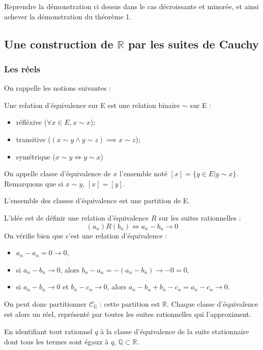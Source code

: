 \begin{exo}
    Reprendre la démonstration ci dessus dans le cas décroissante et minorée, et ainsi achever la démonstration du théorème 1.
\end{exo}

\subsection{Une construction de $\mathbb{R}$ par les suites de Cauchy}
\subsubsection{Les réels}
On rappelle les notions suivantes :
\begin{defini}
Une relation d'équivalence sur E est une relation binaire $\sim$ sur E :
\begin{itemize}
\item réfléxive ($\forall x\in E, x\sim x$);
\item transitive ($(x\sim y \land y\sim z) \implies x\sim z$);
\item symétrique ($x\sim y \iff y\sim x$)
\end{itemize}

On appelle classe d'équivalence de $x$ l'ensemble noté $[x]=\{y\in E|y\sim x\}$. Remarquons que si $x\sim y$, $[x]=[y]$.
\end{defini}

\begin{prop}
    L'ensemble des classes d'équivalence est une partition de E.
\end{prop}

L'idée est de définir une relation d'équivalence $R$ sur les suites rationnelles :
$$(a_{n}) R (b_{n}) \iff a_{n}-b_{n} \to 0$$
On vérifie bien que c'est une relation d'équivalence :
\begin{itemize}
    \item $a_n-a_n=0 \to 0$,
    \item si $a_n-b_n \to 0$, alors $b_n-a_n = -(a_n-b_n) \to -0 =0$,
    \item si $a_n-b_n \to 0$ et $b_n-c_n \to 0$, alors $a_n-b_n+b_n-c_n = a_n-c_n \to 0$.
\end{itemize}

On peut donc partitionner $\mathcal{C}_{\mathbb{Q}}$ : cette partition est $\mathbb{R}$. Chaque classe d'équivalence est alors un réel, représenté par toutes les suites rationnelles qui l'approximent.

En identifiant tout rationnel $q$ à la classe d'équivalence de la suite stationnaire dont tous les termes sont égaux à $q$, $\mathbb{Q}\subset \mathbb{R}$.

